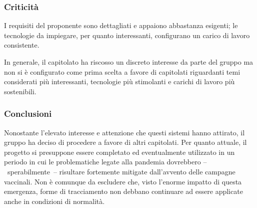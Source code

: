\subsubsection{Criticità}

I requisiti del proponente sono dettagliati e appaiono abbastanza esigenti; le tecnologie da impiegare, per quanto interessanti, configurano un carico di lavoro consistente.

In generale, il capitolato ha riscosso un discreto interesse da parte del gruppo ma non si è configurato come prima scelta a favore di capitolati riguardanti temi considerati più interessanti, tecnologie più stimolanti e carichi di lavoro più sostenibili. 



\subsubsection{Conclusioni}

Nonostante l'elevato interesse e attenzione che questi sistemi hanno attirato, il gruppo ha deciso di procedere a favore di altri capitolati.
Per quanto attuale, il progetto si presuppone essere completato ed eventualmente utilizzato in un periodo in cui le problematiche legate alla pandemia dovrebbero --~sperabilmente~--  risultare fortemente mitigate dall'avvento delle campagne vaccinali. Non è comunque da escludere che, visto l'enorme impatto di questa emergenza, forme di tracciamento non debbano continuare ad essere applicate anche in condizioni di normalità.




